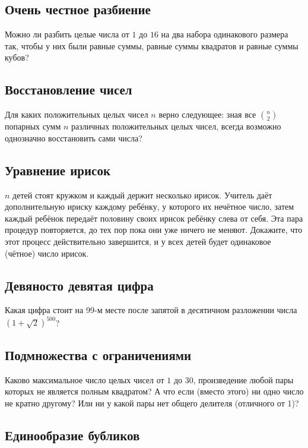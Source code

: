 \subsection*{Очень честное разбиение}

Можно ли разбить целые числа от $1$ до $16$ на два набора одинакового размера так,
чтобы у них были равные суммы, равные суммы квадратов и равные суммы кубов?

\subsection*{Восстановление чисел}
Для каких положительных целых чисел $n$ верно следующее: зная все $\binom n2$ попарных сумм $n$ различных положительных целых чисел, всегда возможно однозначно восстановить сами числа?


\subsection*{Уравнение ирисок}

$n$ детей стоят кружком и каждый держит несколько ирисок.
Учитель даёт дополнительную ириску каждому ребёнку, у которого их нечётное число,
затем каждый ребёнок передаёт половину своих ирисок ребёнку слева от себя.
Эта пара процедур повторяется, до тех пор пока они уже ничего не меняют.
Докажите, что этот процесс действительно завершится, и у всех детей будет одинаковое (чётное) число ирисок.

\subsection*{Девяносто девятая цифра}

Какая цифра стоит на 99-м месте после запятой в десятичном разложении числа 
$(1+\sqrt2)^{500}$?

\subsection*{Подмножества с ограничениями}

Каково максимальное число целых чисел от $1$ до $30$, произведение любой пары которых не является полным квадратом?
А что если (вместо этого) ни одно число не кратно другому?
Или ни у какой пары нет общего делителя (отличного от 1)?

\subsection*{Единообразие бубликов}


